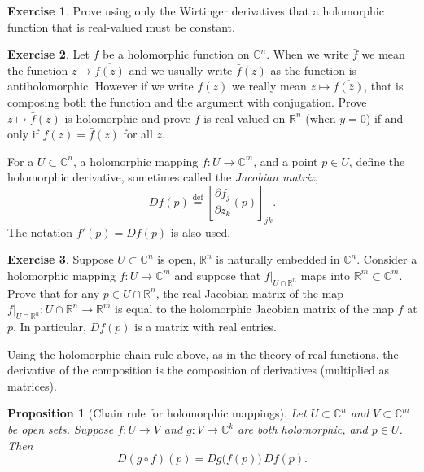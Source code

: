 \documentclass[12pt,openany]{book}
\newcommand{\C}{{\mathbb{C}}}
\newcommand{\R}{{\mathbb{R}}}
\newcommand{\myindex}[1]{#1\index{#1}}
\theoremstyle{plain}
\newtheorem{prop}[thm]{Proposition}
\theoremstyle{remark}
\theoremstyle{definition}
\newenvironment{exbox}{%
    \def\FrameCommand{\vrule width 1pt \relax\hspace {10pt}}%
    \MakeFramed {\advance \hsize -\width \FrameRestore }%
}{%
    \endMakeFramed
}
\theoremstyle{exercise}
\newtheorem{exercise}{Exercise}[section]
\theoremstyle{example}
\begin{document}
\begin{exbox}
\begin{exercise}
Prove using only the Wirtinger derivatives that a holomorphic function
that is real-valued must be constant.
\end{exercise}

\begin{exercise}
Let $f$ be a holomorphic function on $\C^n$.
When we write $\bar{f}$ we mean the function $z \mapsto \overline{f(z)}$
and we usually write $\bar{f}(\bar{z})$ as the function is antiholomorphic.
However if we write $\bar{f}(z)$ we really mean $z \mapsto \overline{f(\bar{z})}$,
that is composing both the function and the argument with conjugation.
Prove $z \mapsto \bar{f}(z)$ is holomorphic and prove $f$ is
real-valued on $\R^n$ (when $y=0$) if and only if $f(z) =
\bar{f}(z)$ for all $z$.
\end{exercise}
\end{exbox}

For a $U \subset \C^n$, a holomorphic mapping $f \colon U \to \C^m$,
and a point $p \in U$,
define the holomorphic derivative, sometimes called the
\emph{\myindex{Jacobian matrix}},
%
\begin{equation*}
Df(p)
\overset{\text{def}}{=}
\left[
\frac{\partial f_j}{\partial z_k} (p)
\right]_{jk} .
\end{equation*}
The notation $f'(p) = Df(p)$ is also used.

\begin{exbox}
\begin{exercise}
Suppose $U \subset \C^n$ is open, $\R^n$ is naturally embedded in $\C^n$.
Consider a holomorphic mapping $f \colon U \to \C^m$ and suppose that
$f|_{U \cap \R^n}$ maps into $\R^m \subset \C^m$.  Prove that for
any $p \in U \cap \R^n$, the real
Jacobian matrix of the map
$f|_{U \cap \R^n} \colon U \cap \R^n \to \R^m$ is equal to the holomorphic
Jacobian matrix of the map $f$ at $p$.  In particular, $Df(p)$ is a matrix
with real entries.
\end{exercise}
\end{exbox}

Using the holomorphic chain rule above, as in the theory of real functions,
the derivative of the composition is the composition of derivatives
(multiplied as matrices).

\begin{prop}[Chain rule for holomorphic mappings]
Let $U \subset \C^n$ and $V \subset \C^m$ be open sets.  Suppose
$f \colon U \to V$ and $g \colon V \to \C^k$ are both holomorphic,
and $p \in U$.  Then
\begin{equation*}
D(g \circ f)(p) = Dg\bigl(f(p)\bigr) \, Df(p) .
\end{equation*}
\end{prop}
\end{document}
